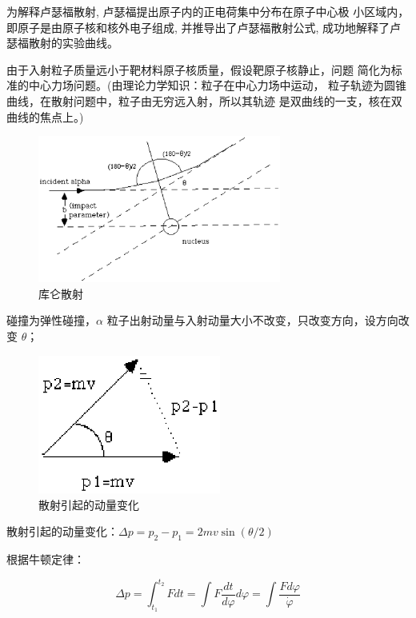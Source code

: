 为解释卢瑟福散射, 卢瑟福提出原子内的正电荷集中分布在原子中心极
小区域内，即原子是由原子核和核外电子组成, 并推导出了卢瑟福散射公式,
成功地解释了卢瑟福散射的实验曲线。


由于入射粒子质量远小于靶材料原子核质量，假设靶原子核静止，问题
简化为标准的中心力场问题。(由理论力学知识：粒子在中心力场中运动，
粒子轨迹为圆锥曲线，在散射问题中，粒子由无穷远入射，所以其轨迹
是双曲线的一支，核在双曲线的焦点上。)


\begin{figure}[h]
\begin{center}
\includegraphics[clip,width=8cm]{AtomIdea/1-4.eps}
\caption{库仑散射}
\end{center}
\end{figure}

碰撞为弹性碰撞，$\alpha $
粒子出射动量与入射动量大小不改变，只改变方向，设方向改变
$\theta$；

\begin{figure}[h]
\begin{center}
\includegraphics[clip,width=6cm]{AtomIdea/1-5.eps}
\caption{散射引起的动量变化}
\end{center}
\end{figure}

散射引起的动量变化：$\Delta p = p_2  - p_1  = 2mv\sin \left(
{\theta /2} \right)$

根据牛顿定律：

\begin{equation}
\Delta p = \int_{t_1 }^{t_2 } {Fdt}  = \int
{F\frac{{dt}}{{d\varphi }}d\varphi }  = \int {\frac{{Fd\varphi
}}{{\dot \varphi }}} 
\end{equation}

